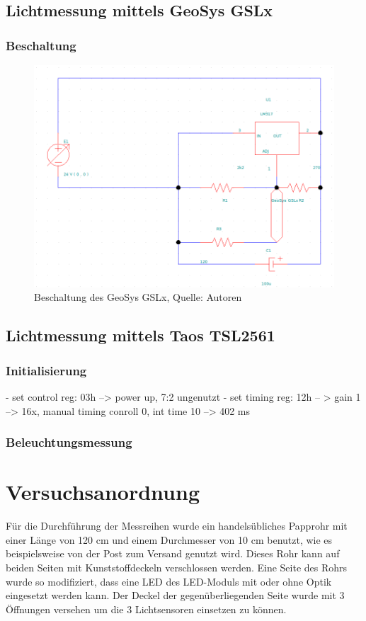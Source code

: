 \documentclass[a4paper,12pt]{scrartcl}
\begin{document}
\subsection{Lichtmessung mittels GeoSys GSLx}
\subsubsection{Beschaltung}
\begin{figure}[H]
\begin{center}
  \includegraphics[width=0.5\hsize]{./images/schaltung-geosys-gslx.png}
\end{center}
\caption[Beschaltung des GeoSys GSLx, Quelle: Autoren]{\label{fig:schaltplangslx}Beschaltung des GeoSys GSLx, Quelle: Autoren}
\end{figure}

\subsection{Lichtmessung mittels Taos TSL2561}
\subsubsection{Initialisierung}
- set control reg: 03h --> power up, 7:2 ungenutzt
- set timing reg: 12h -- > gain 1 --> 16x, manual timing conroll 0, int time 10 --> 402 ms
\subsubsection{Beleuchtungsmessung}

\clearpage
\section{Versuchsanordnung}
Für die Durchführung der Messreihen wurde ein handelsübliches Papprohr mit
einer Länge von 120 cm und einem Durchmesser von 10 cm benutzt, wie es beispielsweise von der Post zum Versand genutzt wird. Dieses Rohr
kann auf beiden Seiten mit Kunststoffdeckeln verschlossen werden. Eine Seite
des Rohrs wurde so modifiziert, dass eine LED des LED-Moduls mit oder ohne
Optik eingesetzt werden kann. Der Deckel der gegenüberliegenden Seite wurde mit
3 Öffnungen versehen um die 3 Lichtsensoren einsetzen zu können.
\end{document}
